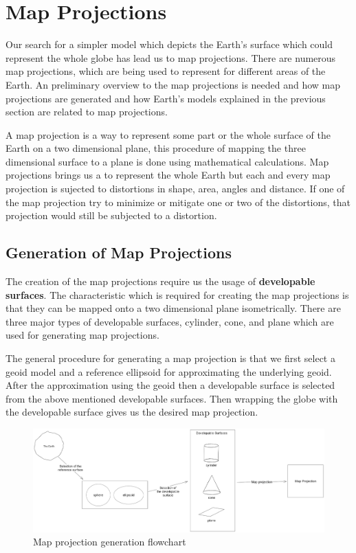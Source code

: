 

\section{Map Projections}
Our search for a simpler model which depicts the Earth's surface which could represent the whole globe has lead us to map projections.
There are numerous map projections, which are being used to represent for different areas of the Earth. An preliminary overview to the map projections is needed and how map projections are generated and how Earth's models explained in the previous section are related to map projections.

A map projection is a way to represent some part or the whole surface of the Earth on a two dimensional plane, this procedure of mapping the three dimensional surface to a plane is done using mathematical calculations.
Map projections brings us a to represent the whole Earth but each and every map projection is sujected to distortions in shape, area, angles and distance. If one of the map projection try to minimize or mitigate one or two of the distortions, that projection would still be subjected to a distortion.

\subsection{Generation of Map Projections}
The creation of the map projections require us the usage of \textbf{developable surfaces}. The characteristic which is required for creating the map projections is that they can be mapped onto a two dimensional plane isometrically\cite{Patrikalakis_Maekawa_2010}.
There are three major types of developable surfaces, cylinder, cone, and plane which are used for generating map projections.

The general procedure for generating a map projection is that we first select a geoid model and a reference ellipsoid for approximating the underlying geoid. After the approximation using the geoid then a developable surface is selected from the above mentioned developable surfaces.
Then wrapping the globe with the developable surface gives us the desired map projection.

\begin{figure}[H]
    \centering
    \includegraphics[width=1.0\textwidth]{figures/chapter-3/map_projection_creation.png}
    \caption{Map projection generation flowchart  }
    \label{fig:earth-image}
\end{figure}


